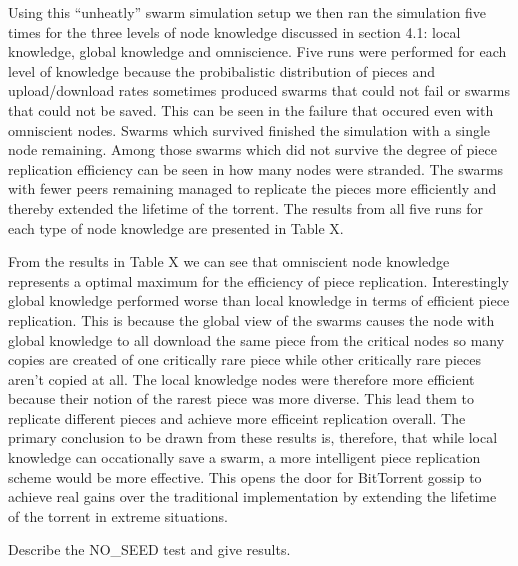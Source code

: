 Using this ``unheatly'' swarm simulation setup we then ran the
simulation five times for the three levels of node knowledge discussed
in section 4.1: local knowledge, global knowledge and
omniscience. Five runs were performed for each level of knowledge
because the probibalistic distribution of pieces and upload/download
rates sometimes produced swarms that could not fail or swarms that
could not be saved. This can be seen in the failure that occured even
with omniscient nodes. Swarms which survived finished the simulation
with a single node remaining. Among those swarms which did not survive
the degree of piece replication efficiency can be seen in how many
nodes were stranded. The swarms with fewer peers remaining managed to
replicate the pieces more efficiently and thereby extended the
lifetime of the torrent. The results from all five runs for each type
of node knowledge are presented in Table X.




From the results in Table X we can see that omniscient node knowledge
represents a optimal maximum for the efficiency of piece
replication. Interestingly global knowledge performed worse than local
knowledge in terms of efficient piece replication. This is because the
global view of the swarms causes the node with global knowledge to all
download the same piece from the critical nodes so many copies are
created of one critically rare piece while other critically rare
pieces aren't copied at all. The local knowledge nodes were therefore
more efficient because their notion of the rarest piece was more
diverse. This lead them to replicate different pieces and achieve more
efficeint replication overall. The primary conclusion to be drawn from
these results is, therefore, that while local knowledge can
occationally save a swarm, a more intelligent piece replication scheme
would be more effective. This opens the door for BitTorrent gossip to
achieve real gains over the traditional implementation by extending
the lifetime of the torrent in extreme situations.

Describe the NO\_SEED test and give results.
